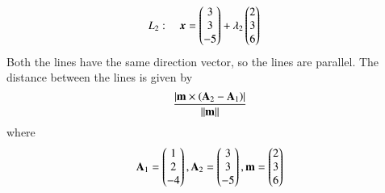 \begin{enumerate}[label=\arabic*.,ref=\thesubsection.\theenumi]
\begin{align}
L_2: \quad \bm{x} &= \begin{pmatrix}3\\3\\-5\end{pmatrix} + \lambda_2\begin{pmatrix}2 \\ 3 \\6\end{pmatrix}
\end{align}
\label{prob:line_dist_parallel}
%
\solution Both the lines have the same direction vector, so the lines are parallel. The distance between the lines is given by 
%
\begin{align}
\label{eq:line_dist_parallel}
\frac{\left\vert\mathbf{m}\times \left(\mathbf{A}_2-
\mathbf{A}_1\right)\right\vert}{\left\lVert\mathbf{m}\right\rVert}
\end{align}
%
where 
%
\begin{align}
\mathbf{A}_1 = \begin{pmatrix}1\\2\\-4\end{pmatrix},
\mathbf{A}_2 = \begin{pmatrix}3\\3\\-5\end{pmatrix},
\mathbf{m}=\begin{pmatrix}2 \\ 3 \\6\end{pmatrix}
\end{align}
%


\end{enumerate}
